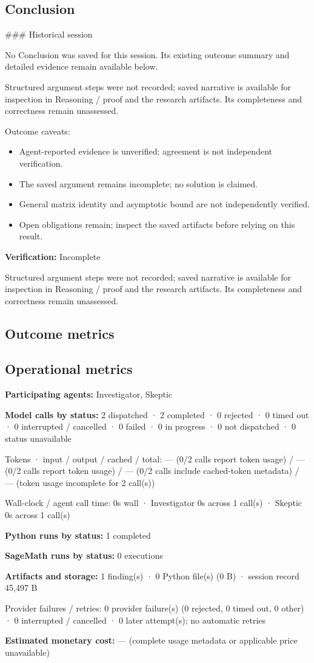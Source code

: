\documentclass[11pt]{article}
\begin{document}
\subsection{Conclusion}
\#\#\# Historical session

No Conclusion was saved for this session. Its existing outcome summary and detailed evidence remain available below.

Structured argument steps were not recorded; saved narrative is available for inspection in Reasoning / proof and the research artifacts. Its completeness and correctness remain unassessed.\par
Outcome caveats:\par
\begin{itemize}
\item Agent-reported evidence is unverified; agreement is not independent verification.
\item The saved argument remains incomplete; no solution is claimed.
\item General matrix identity and asymptotic bound are not independently verified.
\item Open obligations remain; inspect the saved artifacts before relying on this result.
\end{itemize}
\textbf{Verification:} Incomplete\par
Structured argument steps were not recorded; saved narrative is available for inspection in Reasoning / proof and the research artifacts. Its completeness and correctness remain unassessed.\par
\subsection{Outcome metrics}
\subsection{Operational metrics}
\textbf{Participating agents:} Investigator, Skeptic\par
\textbf{Model calls by status:} 2 dispatched · 2 completed · 0 rejected · 0 timed out · 0 interrupted / cancelled · 0 failed · 0 in progress · 0 not dispatched · 0 status unavailable\par
Tokens · input / output / cached / total: — (0/2 calls report token usage) / — (0/2 calls report token usage) / — (0/2 calls include cached-token metadata) / — (token usage incomplete for 2 call(s))\par
Wall-clock / agent call time: 0s wall · Investigator 0s across 1 call(s) · Skeptic 0s across 1 call(s)\par
\textbf{Python runs by status:} 1 completed\par
\textbf{SageMath runs by status:} 0 executions\par
\textbf{Artifacts and storage:} 1 finding(s) · 0 Python file(s) (0 B) · session record 45,497 B\par
Provider failures / retries: 0 provider failure(s) (0 rejected, 0 timed out, 0 other) · 0 interrupted / cancelled · 0 later attempt(s); no automatic retries\par
\textbf{Estimated monetary cost:} — (complete usage metadata or applicable price unavailable)\par
\end{document}
